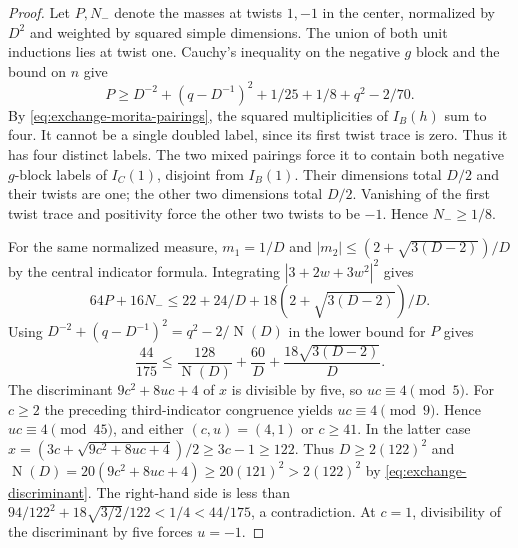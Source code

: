 \documentclass[11pt,a4paper]{article}
\numberwithin{equation}{section}
\begin{document}
\begin{proof}
Let $P,N_-$ denote the masses at twists $1,-1$ in the center, normalized
by $D^2$ and weighted by squared simple dimensions. The union of both
unit inductions lies at twist one. Cauchy's inequality on the negative
$g$ block and the bound on $n$ give
\[
 P\ge D^{-2}+(q-D^{-1})^2+1/25+1/8+q^2-2/70.
\]
By \eqref{eq:exchange-morita-pairings}, the squared multiplicities
of $I_B(h)$ sum to four. It cannot be a
single doubled label, since its first twist trace is zero. Thus it has
four distinct labels. The two mixed pairings force it to contain
both negative $g$-block labels of $I_C(1)$, disjoint from $I_B(1)$.
Their dimensions total $D/2$ and their twists are one; the other two
dimensions total $D/2$. Vanishing of the first twist trace and
positivity force the other two twists to be $-1$. Hence $N_-\ge1/8$.

For the same normalized measure, $m_1=1/D$ and
$|m_2|\le(2+\sqrt{3(D-2)})/D$ by the central indicator formula.
Integrating $|3+2w+3w^2|^2$ gives
\[
 64P+16N_-\le22+24/D+18(2+\sqrt{3(D-2)})/D .
\]
Using $D^{-2}+(q-D^{-1})^2=q^2-2/\operatorname N(D)$ in the lower bound for $P$ gives
\[
 \frac{44}{175}\le
 \frac{128}{\operatorname N(D)}+\frac{60}{D}
       +\frac{18\sqrt{3(D-2)}}{D}.
\]
The discriminant $9c^2+8uc+4$ of $x$ is divisible by five, so $uc\equiv4\pmod5$. For $c\ge2$ the preceding third-indicator congruence yields $uc\equiv4\pmod9$. Hence $uc\equiv4\pmod{45}$, and either $(c,u)=(4,1)$ or $c\ge41$. In the latter case $x=(3c+\sqrt{9c^2+8uc+4})/2\ge3c-1\ge122$. Thus $D\ge2(122)^2$ and $\operatorname N(D)=20(9c^2+8uc+4)\ge20(121)^2>2(122)^2$ by \eqref{eq:exchange-discriminant}. The right-hand side is less than $94/122^2+18\sqrt{3/2}/122<1/4<44/175$, a contradiction. At $c=1$, divisibility of the discriminant by five forces $u=-1$.
\end{proof}



\end{document}
